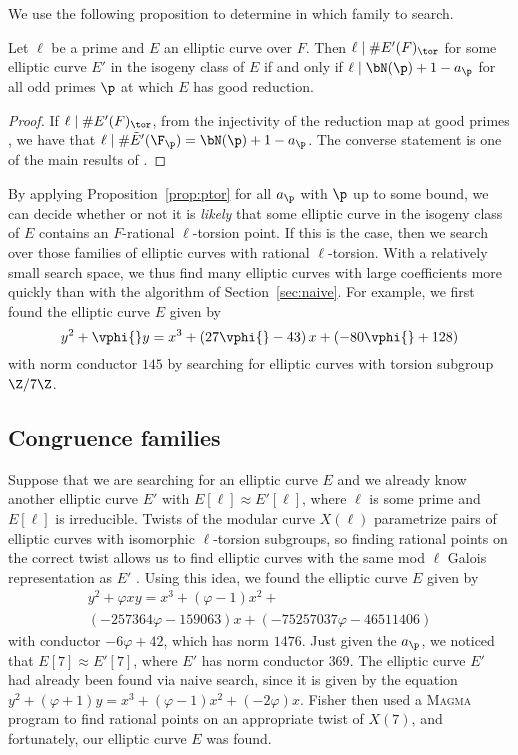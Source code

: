 \documentclass{amsart}
\begin{document}
We use the following proposition to determine in which family to
search.
\begin{proposition}\label{prop:ptor}
Let $\ell$ be a prime and $E$ an elliptic curve over $F$.
Then $\ell \mid \# E'(F)_{\tor}$ for some elliptic curve $E'$ in the isogeny class
of $E$ if and only if $\ell \mid \bN(\p)+1 - a_{\p}$ for all
odd primes $\p$ at which $E$ has good reduction.
\end{proposition}
\begin{proof}
If $\ell  \mid \# E'(F)_{\tor}$, from the injectivity of the
reduction map at good primes \cite[Appendix]{katz:torsion}, we have that
$\ell \mid \#\tilde E'(\F_\p) = \bN(\p)+1 - a_{\p}$. The converse statement
is one of the main results of \cite{katz:torsion}.
\end{proof}

By applying Proposition~\ref{prop:ptor} for all $a_{\p}$ with $\p$ up
to some bound, we can decide whether or not it is {\em likely} that
some elliptic curve in the isogeny class of $E$ contains an $F$-rational
$\ell$-torsion point. If this is the case, then we search over those
families of elliptic curves with rational $\ell$-torsion. With a relatively small
search space, we thus find many elliptic curves with large coefficients more
quickly than with the algorithm of Section~\ref{sec:naive}.
For example, we first found the elliptic curve $E$ given by
$$y^2 + \vphi{}y = x^3 + \left(27 \vphi{} - 43\right)x + \left(-80 \vphi{} + 128\right) 
$$ with norm conductor $145$ by searching for elliptic curves with torsion subgroup $\Z/7\Z$.


\subsection{Congruence families}\label{sec:congfam}

Suppose that we are searching for an elliptic curve $E$ and we already know 
another elliptic curve $E'$ with $E[\ell] \approx E'[\ell]$, where $\ell$ is some prime
and $E[\ell]$ is irreducible. Twists of the modular curve $X(\ell)$ parametrize 
pairs of elliptic curves with isomorphic $\ell$-torsion subgroups, so finding 
rational points on the correct twist allows us to find elliptic curves with the same
mod $\ell$ Galois representation as $E'$ \cite{fisher:families_cong}. Using 
this idea, we found the elliptic curve $E$ given by
\begin{multline}\label{equation:fisher-curve}
y^2 + \varphi{}xy =  x^3 + \left(\varphi{} - 1\right)x^2 + \\ 
\left(-257364 \varphi{} - 159063\right)x + \left(-75257037 \varphi{} - 46511406\right)
\end{multline}
with conductor $-6 \varphi + 42$, which has norm $1476$. Just given the $a_{\p}$,
 we noticed that $E[7]\approx E'[7]$, where $E'$ has norm conductor $369$. The 
 elliptic curve $E'$ had already been found via naive search, since it is given by the
 equation $y^2 + \left(\varphi{} + 1\right)y = x^3 + \left(\varphi{} - 1\right)x^2 + 
 \left(-2 \varphi{}\right)x$. Fisher then used a \textsc{Magma} \cite{magma} 
 program to find rational points on an appropriate twist of $X(7)$, and fortunately, 
 our elliptic curve $E$ was found.
\end{document}
